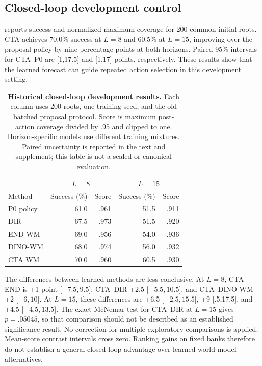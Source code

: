 \subsection{Closed-loop development control}
\label{sec:closed}
 reports success and normalized maximum coverage for 200 common initial roots. CTA achieves 70.0\% success at $L=8$ and 60.5\% at $L=15$, improving over the proposal policy by nine percentage points at both horizons. Paired 95\% intervals for CTA--P0 are [1,17.5] and [1,17] points, respectively. These results show that the learned forecast can guide repeated action selection in this development setting.

\begin{table}[t]
\centering\small
\setlength{\tabcolsep}{4pt}
\begin{tabular}{lrrrr}
\toprule
& \multicolumn{2}{c}{$L=8$} & \multicolumn{2}{c}{$L=15$} \\
Method & Success (\%) & Score & Success (\%) & Score \\
\midrule
P0 policy & 61.0 & .961 & 51.5 & .911 \\
DIR & 67.5 & .973 & 51.5 & .920 \\
END WM & 69.0 & .956 & 54.0 & .936 \\
DINO-WM & 68.0 & .974 & 56.0 & .932 \\
CTA WM & 70.0 & .960 & 60.5 & .930 \\
\bottomrule
\end{tabular}
\caption{\textbf{Historical closed-loop development results.} Each column uses 200 roots, one training seed, and the old batched proposal protocol. Score is maximum post-action coverage divided by .95 and clipped to one. Horizon-specific models use different training mixtures. Paired uncertainty is reported in the text and supplement; this table is not a sealed or canonical evaluation.}
\label{tab:closed}
\end{table}

The differences between learned methods are less conclusive. At $L=8$, CTA--END is +1 point [$-7.5,9.5$], CTA--DIR +2.5 [$-5.5,10.5$], and CTA--DINO-WM +2 [$-6,10$]. At $L=15$, these differences are +6.5 [$-2.5,15.5$], +9 [.5,17.5], and +4.5 [$-4.5,13.5$]. The exact McNemar test for CTA--DIR at $L=15$ gives $p=.05045$, so that comparison should not be described as an established significance result. No correction for multiple exploratory comparisons is applied. Mean-score contrast intervals cross zero. Ranking gains on fixed banks therefore do not establish a general closed-loop advantage over learned world-model alternatives.

